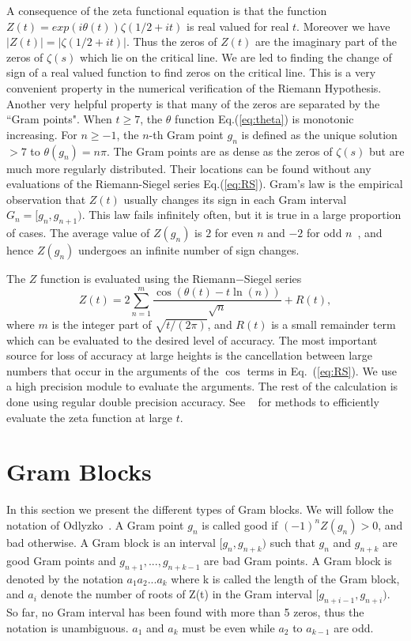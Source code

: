 \documentclass[twoside]{article}
\begin{document}
A consequence of the zeta functional equation is that the function 
$Z(t)=exp(i\theta(t))\zeta(1/2 +it)$ is real valued for real $t$. 
Moreover we have $|Z(t)| = |\zeta(1/2+it)|$. Thus the zeros of $Z(t)$ are the imaginary part of the zeros 
of $\zeta(s)$ which lie on the critical line. We are led to finding the change of sign of a real valued function 
to find zeros on the critical line. This is a very convenient property in the numerical verification 
of the Riemann Hypothesis. Another very helpful property is that many of the zeros are separated by the
``Gram points".  When $t \ge 7$, the $\theta$ function Eq.(\ref{eq:theta}) is monotonic increasing. 
For $n \ge -1$, the $n$-th Gram point $g_n$ is defined as the unique solution $> 7$ to
$\theta (g_n) = n\pi$.
The Gram points are as dense as the zeros of $\zeta(s)$ but are much more regularly distributed.
Their locations can be found without any evaluations of the Riemann-Siegel series Eq.(\ref{eq:RS}).
Gram's law is the empirical observation that $Z(t)$ usually changes its sign in each Gram interval 
$G_n = [g_n,g_{n+1})$. 
This law fails infinitely often, but it is true in a large proportion of cases.
The average value of $Z(g_n)$ is $2$ for even $n$ and $-2$ for odd $n$~\cite{Titchmarsh 1986},
and hence $Z(g_n)$ undergoes an infinite number of sign changes.

The $Z$ function is evaluated using the Riemann$-$Siegel series
\begin{equation}
Z(t) = 2\sum^{m}_{n=1}\frac{\cos(\theta(t) - t \ln (n))}{\sqrt{n}} + R(t), 
\label{eq:RS}
\end{equation}
where $m$ is the integer part of $\sqrt{t/(2\pi)}$, and $R(t)$ is a small remainder
term which can be evaluated to the desired level of accuracy. The most important 
source for loss of accuracy at large heights is the cancellation between
large numbers that occur in the arguments of the $\cos$ terms in Eq.~(\ref{eq:RS}). We 
use a high precision module to evaluate the arguments. The rest of the calculation
is done using regular double precision accuracy. See ~\cite{hiary,gourdon,Odlyzko(1989)} for methods to efficiently evaluate the zeta function at large $t$.

\section{\label{sec4}Gram Blocks}


In this section we present the different types of Gram blocks. We will follow the notation of   Odlyzko~\cite{Odlyzko 1992}. A Gram point $g_n$ is called good if $(-1)^nZ(g_n) > 0$, and bad otherwise. A Gram block is an interval $[g_n, g_{n+k})$ such that $g_n$  and $g_{n+k}$ are good Gram points 
and $g_{n+1}, . . ., g_{n+k-1}$ are bad Gram points. A Gram block is denoted by the notation $a_1a_2 . . . a_k$ where k is called the length of the Gram block, and $a_i$ denote the number of roots of Z(t) in the Gram interval $[g_{n+i-1}, g_{n+i})$. So far, no Gram interval has been found with more than 5 zeros, thus the notation is unambiguous. $a_1$ and $a_k$ must be even while  $a_2$ to $a_{k-1}$ are odd.
\end{document}

